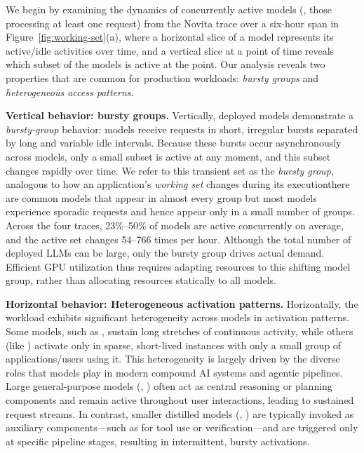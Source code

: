 \label{sec:motivation:model}
We begin by examining the dynamics of concurrently active models (\ie, those processing at least one request) from the Novita trace over a six-hour span in Figure~\ref{fig:working-set}(a), where a horizontal slice of a model represents its active/idle activities over time, and a vertical slice at a point of time reveals which subset of the models is active at the point. 
Our analysis reveals two properties that are common for production workloads:  \emph{bursty groups} and \emph{heterogeneous access patterns}.

\noindent \textbf{Vertical behavior: bursty groups.}
Vertically, deployed models demonstrate a \textit{bursty-group} behavior: models receive requests in short, irregular bursts separated by long and variable idle intervals. Because these bursts occur asynchronously across models, only a small subset is active at any moment, and this subset changes rapidly over time. We refer to this transient set as the \textit{bursty group}, analogous to how an application's \emph{working set} changes during its execution\textemdash there are common models that appear in almost every group but most models experience sporadic requests and hence appear only in a small number of groups. 
Across the four traces, 23\%--50\% of models are active concurrently on average, and the active set changes 54--766 times per hour.
Although the total number of deployed LLMs can be large, only the bursty group drives actual demand. Efficient GPU utilization thus requires adapting resources to this shifting model group, rather than allocating resources statically to all models.

\noindent \textbf{Horizontal behavior: Heterogeneous activation patterns.}
Horizontally, the workload exhibits significant heterogeneity across models in activation patterns.
Some models, such as , sustain long stretches of continuous activity, while others (like ) activate only in sparse, short-lived instances with only a small group of applications/users using it.
This heterogeneity is largely driven by the diverse roles that models play in modern compound AI systems and agentic pipelines. Large general-purpose models (\eg, ) often act as central reasoning or planning components and remain active throughout user interactions, leading to sustained request streams. In contrast, smaller distilled models (\eg, ) are typically invoked as auxiliary components—such as for tool use or verification—and are triggered only at specific pipeline stages, resulting in intermittent, bursty activations.

